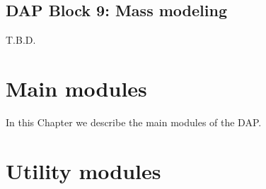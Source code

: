 \documentclass[11pt]{book}
\begin{document}
\section{DAP Block 9: Mass modeling}
\label{dap_sec:block9}
T.B.D.


\chapter{Main modules}
\label{dap_chap:dap_modules}

In this Chapter we describe the main modules of the DAP.



















\chapter{Utility modules}









%




%
%
	
\end{document}
